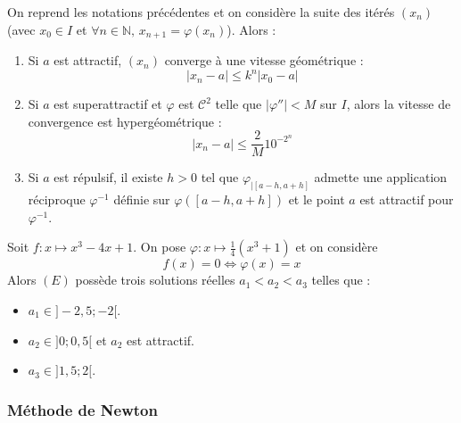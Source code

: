 	\begin{proposition}
		On reprend les notations précédentes et on considère la suite des itérés $(x_n)$ (avec $x_0 \in I$ et $\forall n \in \mathbb{N}, \, x_{n+1} = \varphi(x_n)$). Alors :
		\begin{enumerate}[label=(\roman*)]
			\item Si $a$ est attractif, $(x_n)$ converge à une vitesse géométrique :
			\[ |x_n - a| \leq k^n |x_0 - a| \]
			\item Si $a$ est superattractif et $\varphi$ est $\mathcal{C}^2$ telle que $|\varphi''| < M$ sur $I$, alors la vitesse de convergence est hypergéométrique :
			\[ |x_n - a| \leq \frac{2}{M} 10^{-2^n} \]
			\item Si $a$ est répulsif, il existe $h > 0$ tel que $\varphi_{|[a-h, a+h]}$ admette une application réciproque $\varphi^{-1}$ définie sur $\varphi([a-h, a+h])$ et le point $a$ est attractif pour $\varphi^{-1}$.
		\end{enumerate}
	\end{proposition}
	
	\begin{example}
		Soit $f : x \mapsto x^3 - 4x + 1$. On pose $\varphi : x \mapsto \frac{1}{4} (x^3 + 1)$ et on considère
		\[ f(x) = 0 \iff \varphi(x) = x \tag{$E$} \]
		Alors $(E)$ possède trois solutions réelles $a_1 < a_2 < a_3$ telles que :
		\begin{itemize}
			\item $a_1 \in ]-2,5; -2[$.
			\item $a_2 \in ]0; 0,5[$ et $a_2$ est attractif.
			\item $a_3 \in ]1,5; 2[$.
		\end{itemize}
	\end{example}
	
	\newpage
	
	\subsubsection{Méthode de Newton}
	
	
